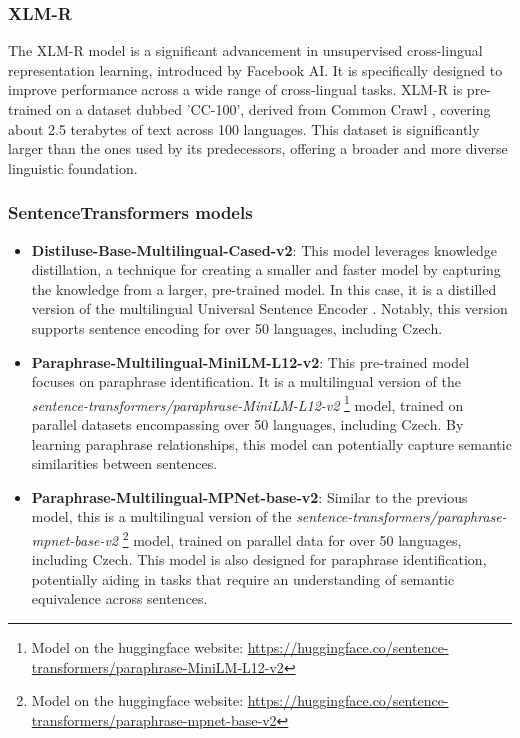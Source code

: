 \subsubsection{XLM-R} \label{model:xlm-roberta}
The \ac{XLM-R} model \cite{xlm-roberta} is a significant advancement in unsupervised cross-lingual representation learning, introduced by Facebook AI.
It is specifically designed to improve performance across a wide range of cross-lingual tasks.
\ac{XLM-R} is pre-trained on a dataset dubbed 'CC-100', derived from Common Crawl \cite{commoncrawl}, covering about 2.5 terabytes of text across 100 languages.
This dataset is significantly larger than the ones used by its predecessors, offering a broader and more diverse linguistic foundation.

\subsubsection{SentenceTransformers models \cite{reimers-2019-sentence-bert}} \label{model:st-multilingual}

\begin{itemize}
  \item \textbf{Distiluse-Base-Multilingual-Cased-v2}:
    This model leverages knowledge distillation, a technique for creating a smaller and faster model by capturing the knowledge from a larger, pre-trained model.
    In this case, it is a distilled version of the multilingual Universal Sentence Encoder \cite{yang2019multilingual}.
    Notably, this version supports sentence encoding for over 50 languages, including Czech.
  \item \textbf{Paraphrase-Multilingual-MiniLM-L12-v2}: This pre-trained model focuses on paraphrase identification.
    It is a multilingual version of the \textit{sentence-transformers/paraphrase-MiniLM-L12-v2} \footnote{Model on the huggingface website: \url{https://huggingface.co/sentence-transformers/paraphrase-MiniLM-L12-v2}} model, trained on parallel datasets encompassing over 50 languages, including Czech.
    By learning paraphrase relationships, this model can potentially capture semantic similarities between sentences.
  \item \textbf{Paraphrase-Multilingual-MPNet-base-v2}: Similar to the previous model, this is a multilingual version of the \textit{sentence-transformers/paraphrase-mpnet-base-v2} \footnote{ Model on the huggingface website: \url{https://huggingface.co/sentence-transformers/paraphrase-mpnet-base-v2}} model, trained on parallel data for over 50 languages, including Czech.
    This model is also designed for paraphrase identification, potentially aiding in tasks that require an understanding of semantic equivalence across sentences.
\end{itemize}


